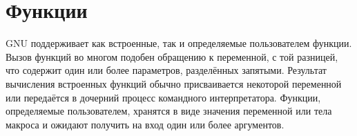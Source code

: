 \chapter{Функции} \label{chap:functions}
GNU \GNUmake{} поддерживает как встроенные, так и определяемые
пользователем функции. Вызов функций во многом подобен обращению к
переменной, с той разницей, что содержит один или более параметров,
разделённых запятыми. Результат вычисления встроенных функций обычно
присваивается некоторой переменной или передаётся в дочерний процесс
командного интерпретатора. Функции, определяемые пользователем,
хранятся в виде значения переменной или тела макроса и ожидают
получить на вход один или более аргументов.





